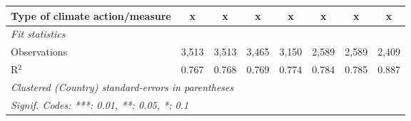 \begin{table}[htbp]
\begin{tabular}{lccccccc}
      Type of climate action/measure                                  & x             & x             & x            & x            & x             & x             & x\\  
      \midrule \emph{Fit statistics}\\
      Observations                                                    & 3,513         & 3,513         & 3,465        & 3,150        & 2,589         & 2,589         & 2,409\\  
      R$^2$                                                           & 0.767         & 0.768         & 0.769        & 0.774        & 0.784         & 0.785         & 0.887\\  
      \midrule
      \multicolumn{8}{l}{\emph{Clustered (Country) standard-errors in parentheses}}\\
      \multicolumn{8}{l}{\emph{Signif. Codes: ***: 0.01, **: 0.05, *: 0.1}}\\
   \end{tabular}
\end{table}


